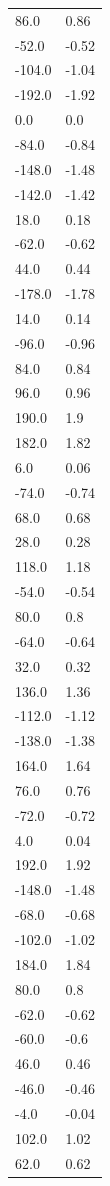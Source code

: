 \begin{longtable}{ll}
86.0 & 0.86 \\
-52.0 & -0.52 \\
-104.0 & -1.04 \\
-192.0 & -1.92 \\
0.0 & 0.0 \\
-84.0 & -0.84 \\
-148.0 & -1.48 \\
-142.0 & -1.42 \\
18.0 & 0.18 \\
-62.0 & -0.62 \\
44.0 & 0.44 \\
-178.0 & -1.78 \\
14.0 & 0.14 \\
-96.0 & -0.96 \\
84.0 & 0.84 \\
96.0 & 0.96 \\
190.0 & 1.9 \\
182.0 & 1.82 \\
6.0 & 0.06 \\
-74.0 & -0.74 \\
68.0 & 0.68 \\
28.0 & 0.28 \\
118.0 & 1.18 \\
-54.0 & -0.54 \\
80.0 & 0.8 \\
-64.0 & -0.64 \\
32.0 & 0.32 \\
136.0 & 1.36 \\
-112.0 & -1.12 \\
-138.0 & -1.38 \\
164.0 & 1.64 \\
76.0 & 0.76 \\
-72.0 & -0.72 \\
4.0 & 0.04 \\
192.0 & 1.92 \\
-148.0 & -1.48 \\
-68.0 & -0.68 \\
-102.0 & -1.02 \\
184.0 & 1.84 \\
80.0 & 0.8 \\
-62.0 & -0.62 \\
-60.0 & -0.6 \\
46.0 & 0.46 \\
-46.0 & -0.46 \\
-4.0 & -0.04 \\
102.0 & 1.02 \\
62.0 & 0.62 \\

\end{longtable}
